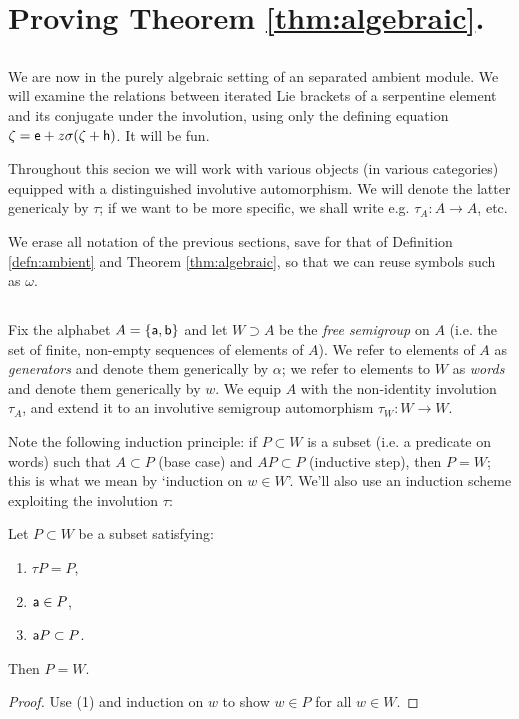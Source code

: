 \section{Proving Theorem \ref{thm:algebraic}.}
\label{sec:proving}
\subsection*{}
We are now in the purely algebraic setting of an separated ambient module.
We will examine the relations between iterated Lie brackets of a serpentine
element and its conjugate under the involution, using only the defining
equation $\zeta = \mathsf{e} + z \sigma(\zeta + \mathsf{h})$. It will be fun.

Throughout this secion we will work with various objects (in various
categories) equipped with a distinguished involutive automorphism. We will
denote the latter genericaly by $\tau$; if we want to be more specific, we shall
write e.g. $\tau_A : A \to A$, etc.

We erase all notation of the previous sections, save for that of
Definition \ref{defn:ambient} and Theorem \ref{thm:algebraic}, so that we can reuse symbols such as $\omega$.

\subsection{}
Fix the alphabet $A = \{\mathsf{a},\mathsf{b}\}$ and let $W\supset A$ be the \emph{free semigroup}
on $A$ (i.e. the set of finite, non-empty sequences of elements of $A$). We
refer to elements of $A$ as \emph{generators} and denote them generically by $\alpha$;
we refer to elements to $W$ as \emph{words} and denote them generically by $w$.
We equip $A$ with the non-identity involution $\tau_A$, and extend it to an
involutive semigroup automorphism $\tau_W:W\to W$. 

Note the following induction principle:
if $P\subset W$ is a subset (i.e. a predicate on words) such that $A \subset P$ (base case) and $AP \subset P$ (inductive step), 
then $P=W$; this is what we mean by `induction on $w\in W$'.
We'll also use an induction scheme exploiting the involution $\tau$:
\begin{lem} \label{lem:w-ind}
Let $P\subset W$ be a subset satisfying:
\begin{enumerate}
        \item $\tau P = P$,
        \item $\mathsf{a} \in P$,
        \item $\mathsf{a} P \subset P$.
\end{enumerate}
Then $P=W$.
\end{lem}
\begin{proof}
Use (1) and induction on $w$ to show $w\in P$ for all $w\in W$.
\end{proof}

